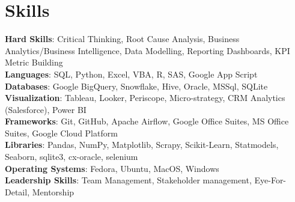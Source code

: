 \section{Skills}
  \begin{itemize}[leftmargin=0.1in, label={}]
    \normalsize{\item{
      \textbf{Hard Skills}: Critical Thinking, Root Cause Analysis, Business Analytics/Business Intelligence, Data Modelling, Reporting Dashboards, KPI Metric Building \\
      \textbf{Languages}: SQL, Python, Excel, VBA, R, SAS, Google App Script\\
      \textbf{Databases}: Google BigQuery, Snowflake, Hive, Oracle, MSSql, SQLite \\
      \textbf{Visualization}: Tableau, Looker, Periscope, Micro-strategy, CRM Analytics (Salesforce), Power BI \\
      \textbf{Frameworks}: Git, GitHub, Apache Airflow, Google Office Suites, MS Office Suites, Google Cloud Platform \\
      \textbf{Libraries}: Pandas, NumPy, Matplotlib, Scrapy, Scikit-Learn, Statmodels, Seaborn, sqlite3, cx-oracle, selenium \\
      \textbf{Operating Systems}: Fedora, Ubuntu, MacOS, Windows \\
      \textbf{Leadership Skills}: Team Management, Stakeholder management, Eye-For-Detail, Mentorship \\
     }}
  \end{itemize}
\vspace{-10pt}
